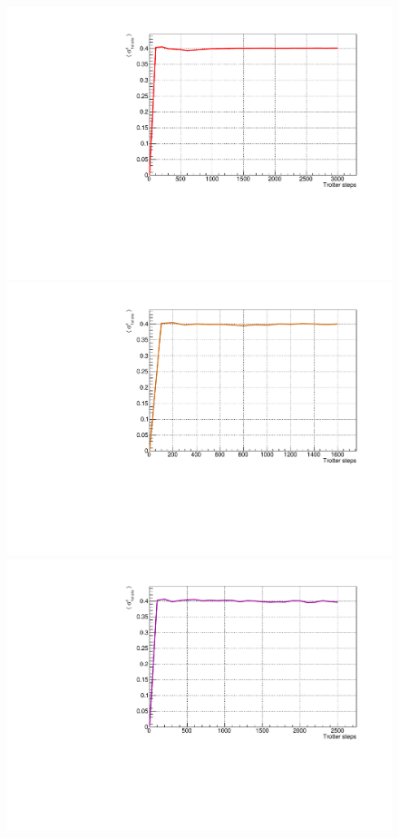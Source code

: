 \begin{figure}[H]
\centering
    \includegraphics[scale=0.35]{Figures/convergence/Convergence_s8T3000J1051.pdf}
    \includegraphics[scale=0.35]{Figures/convergence/Convergence_LM_L012_m060_Time001600_J1051.pdf}
    \includegraphics[scale=0.35]{Figures/convergence/ConvergenceLM_L016_m080_Time002500_J1051.pdf}

\end{figure}
